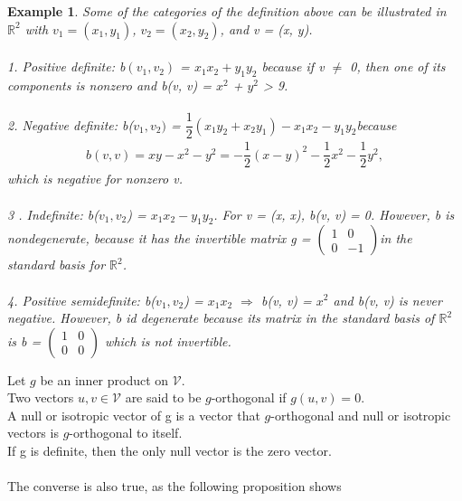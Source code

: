 \documentclass[12pt,a4paper]{article}
\newtheorem{exmp}{Example}[section]
\begin{document}
\begin{exmp}
Some of the categories of the definition above can be illustrated in $\mathbb{R}^2$ with $v_1 = (x_1, y_1)$, $v_2 = (x_2, y_2)$, and v = (x, y).\\\\
1. Positive definite: b$(v_1, v_2)$ = $x_1 x_2 + y_1 y_2$ because if v $\ne$ 0, then one of its components is nonzero and b(v, v) = $x^2$ + $y^2$ > 9. \\\\
2. Negative definite: b($v_1, v_2)$ = $\dfrac{1}{2}(x_1 y_2 + x_2 y_1) - x_1 x_2 - y_1 y_2 $because 
\begin{align*}
b(v, v) = x y - x^2 - y^2 = - \dfrac{1}{2}(x - y)^2 - \dfrac{1}{2}x^2 -\dfrac{1}{2} y^2,
\end{align*}
which is negative for nonzero v.
\\\\
3 . Indefinite: b($v_1,v_2$) = $x_1 x_2 - y_1 y_2$. For v = (x, x), b(v, v) = 0. However, b is nondegenerate, because it has the invertible matrix g = 
$\begin{pmatrix}
1 & 0 \\
0 & -1 
\end{pmatrix} $in the standard basis for $\mathbb{R}^2$.
\\\\
4. Positive semidefinite: b($v_1, v_2$) = $x_1 x_2$ $\Rightarrow$ b(v, v) = $x ^2$ and b(v, v) is never negative. However, b id degenerate because its matrix in the standard basis of $\mathbb{R}^2$ is b = 
$\begin{pmatrix}
1 & 0\\
0 & 0
\end{pmatrix}$
which is not invertible.
\end{exmp}
Let $g$ be an inner product on $\mathcal{V}$. \\
Two vectors $u, v$$\in$$\mathcal{V}$ are said to be
$g$-orthogonal if $g(u, v) = 0$. \\A null or isotropic vector of g is a vector that
$g$-orthogonal and null or
isotropic vectors
is $g$-orthogonal to itself. \\If g is definite, then the only null vector is the zero
vector. \\\\The converse is also true, as the following proposition shows
\end{document}
